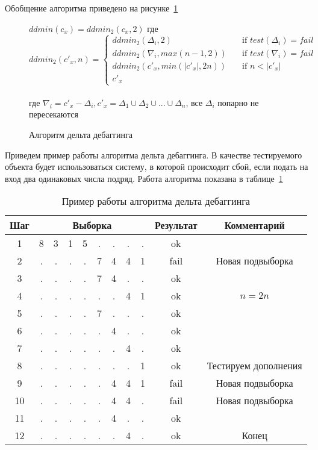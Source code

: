 Обобщение алгоритма приведено на рисунке~\ref{ddminalg}
\begin{figure}
	$ddmin(c_x) = ddmin_2(c_x, 2)$ где \\
\[ ddmin_2(c'_x, n) =
  \begin{cases}
    ddmin_2(\Delta_i, 2)       & \quad \text{if } test(\Delta_i) = fail\\
    ddmin_2(\nabla_i, max(n - 1, 2))       & \quad \text{if } test(\nabla_i) = fail\\
    ddmin_2(c'_x, min(|c'_x|, 2n))       & \quad \text{if } n < |c'_x|\\
    c'_x
  \end{cases}
\]
\\
где $\nabla_i = c'_x - \Delta_i, c'_x = \Delta_1 \cup \Delta_2 \cup ... \cup \Delta_n$, все $\Delta_i$ попарно не пересекаются
\caption{Алгоритм дельта дебаггинга}
\label{ddminalg}
\end{figure}
Приведем пример работы алгоритма дельта дебаггинга. В качестве тестируемого объекта будет использоваться систему, в которой происходит сбой, если подать на вход два одинаковых числа подряд. Работа алгоритма показана в таблице~\ref{tab:ddminex2}
\begin{table}[]
\center
\caption{\label{tab:ddminex2}Пример работы алгоритма дельта дебаггинга}
\begin{tabular}{| c | *{8}{c} | c | c |}
\hline
\bf Шаг & \multicolumn{8}{|c|}{\bf Выборка} & {\bf Результат} & {\bf Комментарий}\\
\hline
1 &  8 & 3 & 1 & 5 & . & . & . & .  & ok & \\
\hline
2 &  . & . & . & . & 7 & 4 & 4 & 1 & fail & Новая подвыборка\\
\hline
3 &  . & . & . & . & 7 & 4 & . & . & ok & \\
\hline
4 &  . & . & . & . & . & . & 4 & 1 & ok & $n = 2n$\\
\hline
5 &  . & . & . & . & 7 & . & . & . & ok & \\
\hline
6 &  . & . & . & . & . & 4 & . & . & ok &\\
\hline
7 &  . & . & . & . & . & . & 4 & . & ok &\\
\hline
8 &  . & . & . & . & . & . & . & 1 & ok &Тестируем дополнения\\
\hline
9 &  . & . & . & . & . & 4 & 4 & 1 & fail &Новая подвыборка\\
\hline
10 &  . & . & . & . & . & 4 & 4 & . & fail &Новая подвыборка\\
\hline
11 &  . & . & . & . & . & 4 & . & . & ok &\\
\hline
12 &  . & . & . & . & . & . & 4 & . & ok & Конец\\
\hline
\end{tabular}
\end{table}

